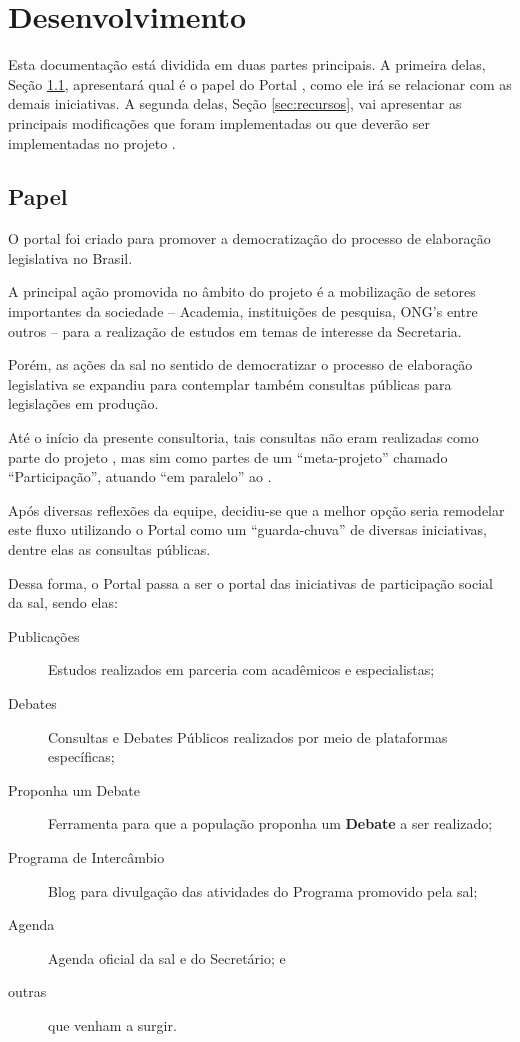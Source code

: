 \chapter{Desenvolvimento}
Esta documentação está dividida em duas partes principais. A primeira delas, Seção \ref{sec:papel}, apresentará qual é o papel do Portal \ppod, como ele irá se relacionar com as demais iniciativas. A segunda delas, Seção \ref{sec:recursos}, vai apresentar as principais modificações que foram implementadas ou que deverão ser implementadas no projeto \ppod.

\section{Papel}\label{sec:papel}
O portal \ppod foi criado para promover a democratização do processo de elaboração legislativa no Brasil.

A principal ação promovida no âmbito do projeto é a mobilização de setores importantes da sociedade – Academia, instituições de pesquisa, ONG’s entre outros – para a realização de estudos em temas de interesse da Secretaria.
	
Porém, as ações da \gls{sal} no sentido de democratizar o processo de elaboração legislativa se expandiu para contemplar também consultas públicas para legislações em produção.

Até o início da presente consultoria, tais consultas não eram realizadas como parte do projeto \ppod, mas sim como partes de um ``meta-projeto'' chamado ``Participação'', atuando ``em paralelo'' ao \ppod.

Após diversas reflexões da equipe, decidiu-se que a melhor opção seria remodelar este fluxo utilizando o Portal \ppod como um ``guarda-chuva'' de diversas iniciativas, dentre elas as consultas públicas.

Dessa forma, o Portal \ppod passa a ser o portal das iniciativas de participação social da \gls{sal}, sendo elas:

\begin{description}
\item[Publicações] Estudos realizados em parceria com acadêmicos e especialistas;
\item[Debates] Consultas e Debates Públicos realizados por meio de plataformas específicas;
\item[Proponha um Debate] Ferramenta para que a população proponha um \textbf{Debate} a ser realizado;
\item[Programa de Intercâmbio] Blog para divulgação das atividades do Programa promovido pela \gls{sal};
\item[Agenda] Agenda oficial da \gls{sal} e do Secretário; e
\item[outras] que venham a surgir.
\end{description}

